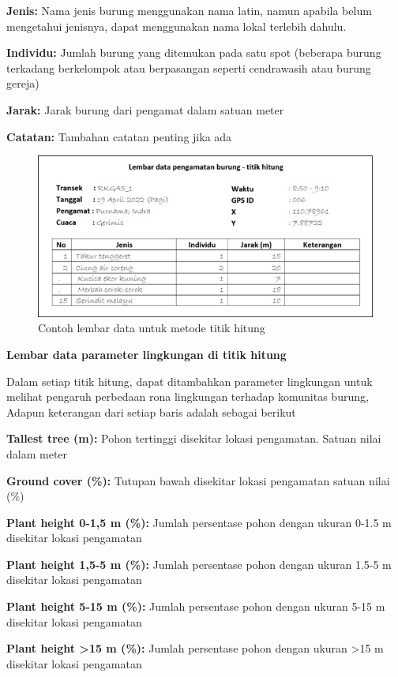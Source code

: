 \documentclass[
]{book}
\begin{document}
\textbf{Jenis:} Nama jenis burung menggunakan nama latin, namun apabila belum mengetahui jenisnya, dapat menggunakan nama lokal terlebih dahulu.

\textbf{Individu:} Jumlah burung yang ditemukan pada satu spot (beberapa burung terkadang berkelompok atau berpasangan seperti cendrawasih atau burung gereja)

\textbf{Jarak:} Jarak burung dari pengamat dalam satuan meter

\textbf{Catatan:} Tambahan catatan penting jika ada

\begin{figure}

{\centering \includegraphics[width=0.75\linewidth]{images/ldp_th} 

}

\caption{Contoh lembar data untuk metode titik hitung}\label{fig:ldpth}
\end{figure}

\textbf{Lembar data parameter lingkungan di titik hitung}

Dalam setiap titik hitung, dapat ditambahkan parameter lingkungan untuk melihat pengaruh perbedaan rona lingkungan terhadap komunitas burung, Adapun keterangan dari setiap baris adalah sebagai berikut

\textbf{Tallest tree (m):} Pohon tertinggi disekitar lokasi pengamatan. Satuan nilai dalam meter

\textbf{Ground cover (\%):} Tutupan bawah disekitar lokasi pengamatan satuan nilai (\%)

\textbf{Plant height 0-1,5 m (\%):} Jumlah persentase pohon dengan ukuran 0-1.5 m disekitar lokasi pengamatan

\textbf{Plant height 1,5-5 m (\%):} Jumlah persentase pohon dengan ukuran 1.5-5 m disekitar lokasi pengamatan

\textbf{Plant height 5-15 m (\%):} Jumlah persentase pohon dengan ukuran 5-15 m disekitar lokasi pengamatan

\textbf{Plant height \textgreater15 m (\%):} Jumlah persentase pohon dengan ukuran \textgreater15 m disekitar lokasi pengamatan
\end{document}
